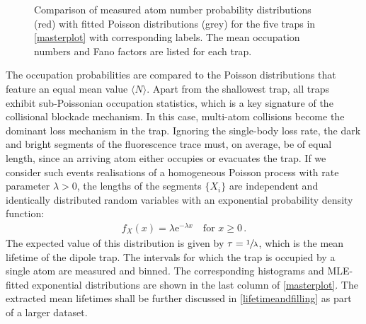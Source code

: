 \documentclass[../Thesis-IJspeert.tex]{subfiles}
\begin{document}
\begin{figure}[t]
	\caption[Comparison of measured atom number probability distributions with fitted Poisson distributions]{Comparison of measured atom number probability distributions (red) with fitted Poisson distributions (grey) for the five traps in \autoref{masterplot} with corresponding labels. The mean occupation numbers and Fano factors are listed for each trap.}
	\label{fig:distributions}
\end{figure}
The occupation probabilities are compared to the Poisson distributions that feature an equal mean value $\langle N \rangle $. Apart from the shallowest trap, all traps exhibit sub-Poissonian occupation statistics, which is a key signature of the collisional blockade mechanism. In this case, multi-atom collisions become the dominant loss mechanism in the trap. Ignoring the single-body loss rate, the dark and bright segments of the fluorescence trace must, on average, be of equal length, since an arriving atom either occupies or evacuates the trap. If we consider such events realisations of a homogeneous Poisson process with rate parameter $\lambda > 0$, the lengths of the segments $\{X_i\}$ are independent and identically distributed random variables with an exponential probability density function:
\begin{align}
f_X(x) = \lambda\mathrm{e}^{-\lambda x} \quad \text{for } x \geq 0\,.
\end{align}
The expected value of this distribution is given by $\tau = \sfrac{1}{\lambda}$, which is the mean lifetime of the dipole trap. The intervals for which the trap is occupied by a single atom are measured and binned. The corresponding histograms and MLE-fitted exponential distributions are shown in the last column of \autoref{masterplot}. The extracted mean lifetimes shall be further discussed in \autoref{lifetimeandfilling} as part of a larger dataset.
\end{document}
